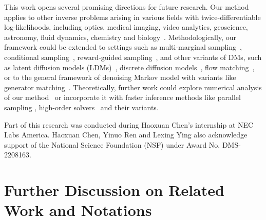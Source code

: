 \documentclass{article}
\numberwithin{equation}{section}
\begin{document}
This work opens several promising directions for future research. 
Our method applies to other inverse problems arising in various fields with twice-differentiable log-likelihoods, including optics, medical imaging, video analytics, geoscience, astronomy, fluid dynamics, chemistry and biology~\cite{sun2024provable,wu2024principled,zheng2025inversebench,jaganathan2016phase,fienup1982phase,candes2015wirtinger,candes2015phase,kantas2014sequential,daras2024warped,zhang2025step,jing2024alphafold,maddipatla2025inverse,sridharan2022deep,hu2024accurate}.
Methodologically, our framework could be extended to settings such as multi-marginal sampling~\cite{albergo2023multimarginal,lindsey2025mne}, conditional sampling~\cite{zhu2023conditional}, reward-guided sampling~\cite{uehara2025reward}, and other variants of DMs, such as latent diffusion models (LDMs)~\cite{rombach2022high,song2023solvinglatent}, discrete diffusion models~\cite{murata2024g2d2, luan2025ddps,chu2025split,
austin2021structured, hoogeboom2021autoregressive, hoogeboom2021argmax, meng2022concrete, sun2022score, richemond2022categorical, lou2023discrete, floto2023diffusion, santos2023blackout, chen2024convergence, ren2024discrete}, flow matching~\cite{zhang2024flow}, or to the general framework of denoising Markov model with variants like generator matching~\cite{benton2024denoising,holderrieth2024generator,ren2025unified}.
Theoretically, further work could explore numerical analysis of our method~\cite{chen2022sampling,chen2023improved,chen2024probability} or incorporate it with faster inference methods like parallel sampling \citep{shih2024parallel, tang2024accelerating, cao2024deep, selvam2024self, chen2024accelerating, gupta2024faster}, high-order solvers~\cite{karras2022elucidating,lu2022dpm++,liu2022pseudo,lu2022dpm, zheng2023dpm, li2024accelerating,wu2024stochastic,ren2025fast} and their variants.

\begin{ack}
Part of this research was conducted during Haoxuan Chen's internship at NEC Labs America. Haoxuan Chen, Yinuo Ren and Lexing Ying also acknowledge support of the National Science Foundation (NSF) under Award No. DMS-2208163. 
\end{ack}



\newpage
\appendix

\section{Further Discussion on Related Work and Notations}
\end{document}
